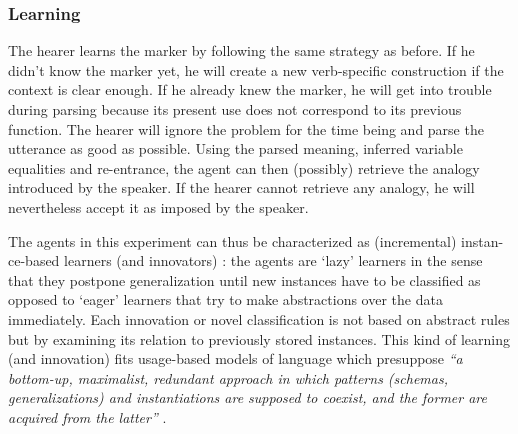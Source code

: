 \subsubsection{Learning}
 The hearer learns the marker by following the same strategy as before. If he didn't know the marker yet, he will create a new verb-specific construction if the context is clear enough. If he already knew the marker, he will get into trouble during parsing because its present use does not correspond to its previous function. The hearer will ignore the problem for the time being and parse the utterance as good as possible. Using the parsed meaning, inferred variable equalities and re-entrance, the agent can then (possibly) retrieve the analogy introduced by the speaker. If the hearer cannot retrieve any analogy, he will nevertheless accept it as imposed by the speaker.

The agents in this experiment can thus be characterized as (incremental) instan-ce-based learners (and innovators) \citep[Chapter 8]{mitchell97machine}: the agents are `lazy' learners in the sense that they postpone generalization until new instances have to be classified as opposed to `eager' learners that try to make abstractions over the data immediately. Each innovation or novel classification is not based on abstract rules but by examining its relation to previously stored instances.  This kind of learning (and innovation) fits usage-based models of language which presuppose {\em ``a bottom-up, maximalist, redundant approach in which patterns (schemas, generalizations) and instantiations are supposed to coexist, and the former are acquired from the latter''} \citep[20]{daelemans05memory}.


